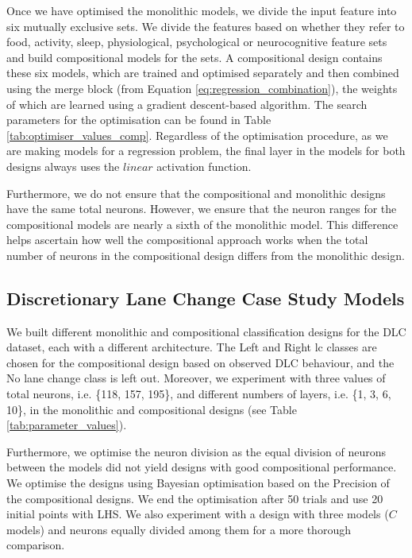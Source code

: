 Once we have optimised the monolithic models, we divide the input feature into six mutually exclusive sets. We divide the features based on whether they refer to food, activity, sleep, physiological, psychological or neurocognitive feature sets and build compositional models for the sets. A compositional design contains these six models, which are trained and optimised separately and then combined using the merge block (from Equation \ref{eq:regression_combination}), the weights of which are learned using a gradient descent-based algorithm. The search parameters for the optimisation can be found in Table \ref{tab:optimiser_values_comp}. Regardless of the optimisation procedure, as we are making models for a regression problem, the final layer in the models for both designs always uses the $linear$ activation function.

Furthermore, we do not ensure that the compositional and monolithic designs have the same total neurons. However, we ensure that the neuron ranges for the compositional models are nearly a sixth of the monolithic model. This difference helps ascertain how well the compositional approach works when the total number of neurons in the compositional design differs from the monolithic design. 



\subsection{Discretionary Lane Change Case Study Models}

We built different monolithic and compositional classification designs for the DLC dataset, each with a different architecture. The Left and Right \gls{lc} classes are chosen for the compositional design based on observed DLC behaviour, and the No lane change class is left out. Moreover, we experiment with three values of total neurons, i.e. \{118, 157, 195\}, and different numbers of layers, i.e. \{1, 3, 6, 10\}, in the monolithic and compositional designs (see Table \ref{tab:parameter_values}).

Furthermore, we optimise the neuron division as the equal division of neurons between the models did not yield designs with good compositional performance. We optimise the designs using Bayesian optimisation based on the Precision of the compositional designs. We end the optimisation after 50 trials and use 20 initial points with LHS. We also experiment with a design with three models ($C$ models) and neurons equally divided among them for a more thorough comparison.

